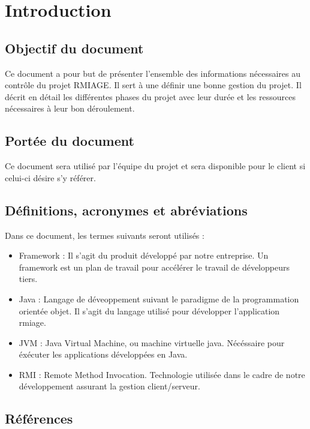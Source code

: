 
\section{Introduction}
\subsection{Objectif du document}
Ce document a pour but de présenter l'ensemble des informations nécessaires au
contrôle du projet RMIAGE. Il sert à une définir une bonne gestion du projet.
Il décrit en détail les différentes phases du projet avec leur durée et les ressources nécessaires à leur bon 	déroulement.

\subsection{Portée du document}
Ce document sera utilisé par l’équipe du projet et sera disponible pour le client si celui-ci désire s'y référer.

\subsection{Définitions, acronymes et abréviations}
Dans ce document, les termes suivants seront utilisés :
\begin{itemize}
	\item Framework :
Il s'agit du produit développé par notre entreprise. Un framework est un plan de travail pour accélérer le travail de développeurs tiers.
	\item Java :
Langage de déveoppement suivant le paradigme de la programmation orientée objet. Il s'agit du langage utilisé pour développer l'application rmiage.
	\item JVM :
Java Virtual Machine, ou machine virtuelle java. Nécéssaire pour éxécuter les applications développées en Java.
	\item RMI :
Remote Method Invocation. Technologie utilisée dans le cadre de notre développement assurant
la gestion client/serveur.
\end{itemize}

\subsection{Références}
